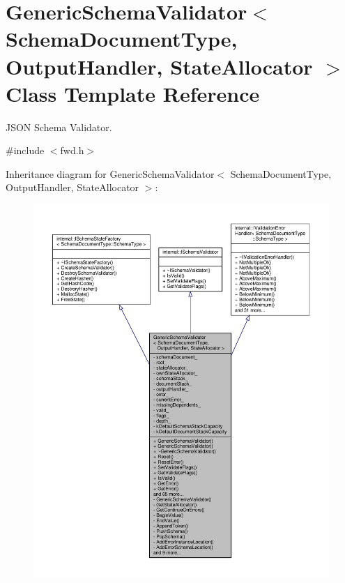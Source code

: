 \hypertarget{classGenericSchemaValidator}{}\section{Generic\+Schema\+Validator$<$ Schema\+Document\+Type, Output\+Handler, State\+Allocator $>$ Class Template Reference}
\label{classGenericSchemaValidator}


J\+S\+ON Schema Validator.  




{\ttfamily \#include $<$fwd.\+h$>$}



Inheritance diagram for Generic\+Schema\+Validator$<$ Schema\+Document\+Type, Output\+Handler, State\+Allocator $>$\+:
\nopagebreak
\begin{figure}[H]
\begin{center}
\leavevmode
\includegraphics[width=350pt]{classGenericSchemaValidator__inherit__graph}
\end{center}
\end{figure}


